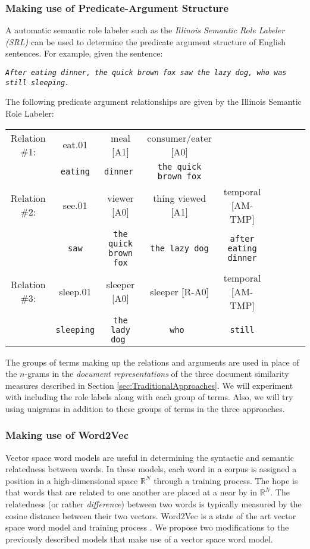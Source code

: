 \documentclass[11pt]{article}
\begin{document}
\subsubsection{Making use of Predicate-Argument Structure} \label{sec:PredicateArgument}

A automatic semantic role labeler such as the {\it Illinois Semantic Role Labeler (SRL)} \cite{Punyakanok2008} can be used to determine the predicate argument structure of English sentences. For example, given the sentence:  

\begin{center}
\tt \emph{After eating dinner, the quick brown fox saw the lazy dog, who was still sleeping.}
\end{center}

The following predicate argument relationships are given by the Illinois Semantic Role Labeler:

\begin{center}
\begin{tabular}{ccccccccc}
Relation \#1: & eat.01 & meal [A1] & consumer/eater [A0]  \\
& {\tt eating} & \tt dinner & {\tt the quick brown fox} \\
Relation \#2:  & see.01 & viewer [A0] & thing viewed [A1] & temporal [AM-TMP] \\
& {\tt saw} & {\tt the quick brown fox} & {\tt the lazy dog} & {\tt after eating dinner} \\
Relation \#3: & sleep.01 & sleeper [A0] & sleeper [R-A0] & temporal [AM-TMP] \\
& {\tt sleeping} & \tt the lady dog & \tt who & \tt still
\end{tabular}
\end{center}

The groups of terms making up the relations and arguments are used in place of the $n$-grams in the \emph{document representations} of the three document similarity measures described in Section \ref{sec:TraditionalApproaches}. We will experiment with including the role labels along with each group of terms. Also, we will try using unigrams in addition to these groups of terms in the three approaches. 


\subsubsection{Making use of Word2Vec} \label{sec:Word2Vec}

Vector space word models are useful in determining the syntactic and semantic relatedness between words. In these models, each word in a corpus is assigned a position in a high-dimensional space $\mathbb{R}^N$ through a training process. The hope is that words that are related to one another are placed at a near by  in $\mathbb{R}^N$. The relatedness (or rather \emph{difference}) between two words is typically measured by the cosine distance between their two vectors. Word2Vec is a state of the art vector space word model and training process  \cite{Mikolov2013efficient}. We propose two modifications to the previously described models that make use of a vector space word model. 
\end{document}
